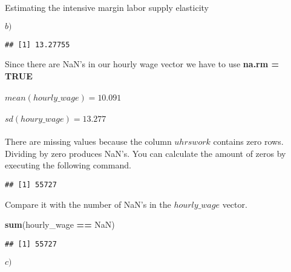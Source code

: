 \documentclass[
  ignorenonframetext,
]{beamer}
\newenvironment{Shaded}{\begin{snugshade}}{\end{snugshade}}
\newcommand{\DecValTok}[1]{\textcolor[rgb]{0.00,0.00,0.81}{#1}}
\newcommand{\KeywordTok}[1]{\textcolor[rgb]{0.13,0.29,0.53}{\textbf{#1}}}
\newcommand{\NormalTok}[1]{#1}
\newcommand{\OperatorTok}[1]{\textcolor[rgb]{0.81,0.36,0.00}{\textbf{#1}}}
\newcommand{\StringTok}[1]{\textcolor[rgb]{0.31,0.60,0.02}{#1}}
\begin{document}
\begin{frame}[fragile]{Estimating the intensive margin labor supply
elasticity}
\begin{block}{\(b)\)}
\begin{verbatim}
## [1] 13.27755
\end{verbatim}

Since there are NaN's in our hourly wage vector we have to use
\textbf{na.rm = TRUE}\\
~\\
\(mean(hourly\_wage) = 10.091\)\\
~\\
\(sd(houry\_wage) = 13.277\)\\
~\\
There are missing values because the column \(uhrswork\) contains zero
rows.\\
Dividing by zero produces NaN's. You can calculate the amount of zeros
by executing the following command.

\begin{Shaded}
\end{Shaded}

\begin{verbatim}
## [1] 55727
\end{verbatim}

Compare it with the number of NaN's in the \(hourly\_wage\) vector.

\begin{Shaded}
\begin{Highlighting}[]
\KeywordTok{sum}\NormalTok{(hourly\_wage }\OperatorTok{==}\StringTok{ \textquotesingle{}NaN\textquotesingle{}}\NormalTok{)}
\end{Highlighting}
\end{Shaded}

\begin{verbatim}
## [1] 55727
\end{verbatim}

\hfill\break
\hfill\break
\hfill\break
\end{block}

\begin{block}{\(c)\)}
\protect\hypertarget{c}{}
\begin{Shaded}
\end{Shaded}


\end{block}
\end{frame}
\end{document}
